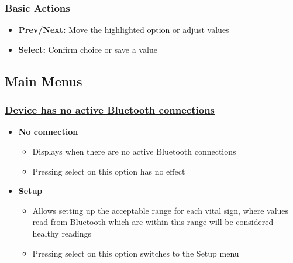 \subsubsection{Basic Actions}
\begin{itemize}
	\item \textbf{Prev/Next:} Move the highlighted option or adjust values
	\item \textbf{Select:} Confirm choice or save a value
\end{itemize}

\subsection{Main Menus}
\subsubsection{\underline{Device has no active Bluetooth connections}}
\begin{itemize}
	\item \textbf{No connection}
	\begin{itemize}
		\item Displays when there are no active Bluetooth connections
		\item Pressing select on this option has no effect
	\end{itemize}
	\item \textbf{Setup}
	\begin {itemize}
		\item Allows setting up the acceptable range for each vital sign, where values read from Bluetooth which are within this range will be considered healthy readings
		\item Pressing select on this option switches to the Setup menu
	\end{itemize}
\end{itemize}
